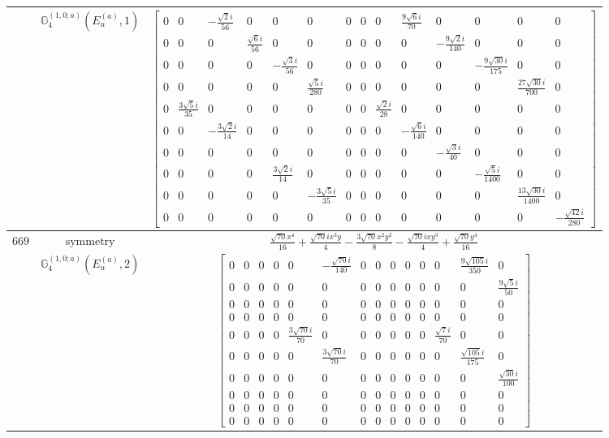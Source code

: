 \documentclass[fleqn,8pt,landscape]{jsarticle}
\begin{document}
\begin{longtable}{ccc}
$  $ & $ \mathbb{G}_{4}^{(1,0;a)}(E_{u}^{(a)},1) $ & $ \begin{bmatrix} 0 & 0 & - \frac{\sqrt{2} i}{56} & 0 & 0 & 0 & 0 & 0 & 0 & \frac{9 \sqrt{6} i}{70} & 0 & 0 & 0 & 0 \\ 0 & 0 & 0 & \frac{\sqrt{6} i}{56} & 0 & 0 & 0 & 0 & 0 & 0 & - \frac{9 \sqrt{2} i}{140} & 0 & 0 & 0 \\ 0 & 0 & 0 & 0 & - \frac{\sqrt{3} i}{56} & 0 & 0 & 0 & 0 & 0 & 0 & - \frac{9 \sqrt{30} i}{175} & 0 & 0 \\ 0 & 0 & 0 & 0 & 0 & \frac{\sqrt{5} i}{280} & 0 & 0 & 0 & 0 & 0 & 0 & \frac{27 \sqrt{30} i}{700} & 0 \\ 0 & \frac{3 \sqrt{5} i}{35} & 0 & 0 & 0 & 0 & 0 & 0 & \frac{\sqrt{2} i}{28} & 0 & 0 & 0 & 0 & 0 \\ 0 & 0 & - \frac{3 \sqrt{2} i}{14} & 0 & 0 & 0 & 0 & 0 & 0 & - \frac{\sqrt{6} i}{140} & 0 & 0 & 0 & 0 \\ 0 & 0 & 0 & 0 & 0 & 0 & 0 & 0 & 0 & 0 & - \frac{\sqrt{3} i}{40} & 0 & 0 & 0 \\ 0 & 0 & 0 & 0 & \frac{3 \sqrt{2} i}{14} & 0 & 0 & 0 & 0 & 0 & 0 & - \frac{\sqrt{5} i}{1400} & 0 & 0 \\ 0 & 0 & 0 & 0 & 0 & - \frac{3 \sqrt{5} i}{35} & 0 & 0 & 0 & 0 & 0 & 0 & \frac{13 \sqrt{30} i}{1400} & 0 \\ 0 & 0 & 0 & 0 & 0 & 0 & 0 & 0 & 0 & 0 & 0 & 0 & 0 & - \frac{\sqrt{42} i}{280} \end{bmatrix} $ \\ \hline
$ 669 $ & $ \text{symmetry} $ & $ \frac{\sqrt{70} x^{4}}{16} + \frac{\sqrt{70} i x^{3} y}{4} - \frac{3 \sqrt{70} x^{2} y^{2}}{8} - \frac{\sqrt{70} i x y^{3}}{4} + \frac{\sqrt{70} y^{4}}{16} $ \\
$  $ & $ \mathbb{G}_{4}^{(1,0;a)}(E_{u}^{(a)},2) $ & $ \begin{bmatrix} 0 & 0 & 0 & 0 & 0 & - \frac{\sqrt{70} i}{140} & 0 & 0 & 0 & 0 & 0 & 0 & \frac{9 \sqrt{105} i}{350} & 0 \\ 0 & 0 & 0 & 0 & 0 & 0 & 0 & 0 & 0 & 0 & 0 & 0 & 0 & \frac{9 \sqrt{5} i}{50} \\ 0 & 0 & 0 & 0 & 0 & 0 & 0 & 0 & 0 & 0 & 0 & 0 & 0 & 0 \\ 0 & 0 & 0 & 0 & 0 & 0 & 0 & 0 & 0 & 0 & 0 & 0 & 0 & 0 \\ 0 & 0 & 0 & 0 & \frac{3 \sqrt{70} i}{70} & 0 & 0 & 0 & 0 & 0 & 0 & \frac{\sqrt{7} i}{70} & 0 & 0 \\ 0 & 0 & 0 & 0 & 0 & \frac{3 \sqrt{70} i}{70} & 0 & 0 & 0 & 0 & 0 & 0 & \frac{\sqrt{105} i}{175} & 0 \\ 0 & 0 & 0 & 0 & 0 & 0 & 0 & 0 & 0 & 0 & 0 & 0 & 0 & \frac{\sqrt{30} i}{100} \\ 0 & 0 & 0 & 0 & 0 & 0 & 0 & 0 & 0 & 0 & 0 & 0 & 0 & 0 \\ 0 & 0 & 0 & 0 & 0 & 0 & 0 & 0 & 0 & 0 & 0 & 0 & 0 & 0 \\ 0 & 0 & 0 & 0 & 0 & 0 & 0 & 0 & 0 & 0 & 0 & 0 & 0 & 0 \end{bmatrix} $ \\ \hline

\end{longtable}
\end{document}

